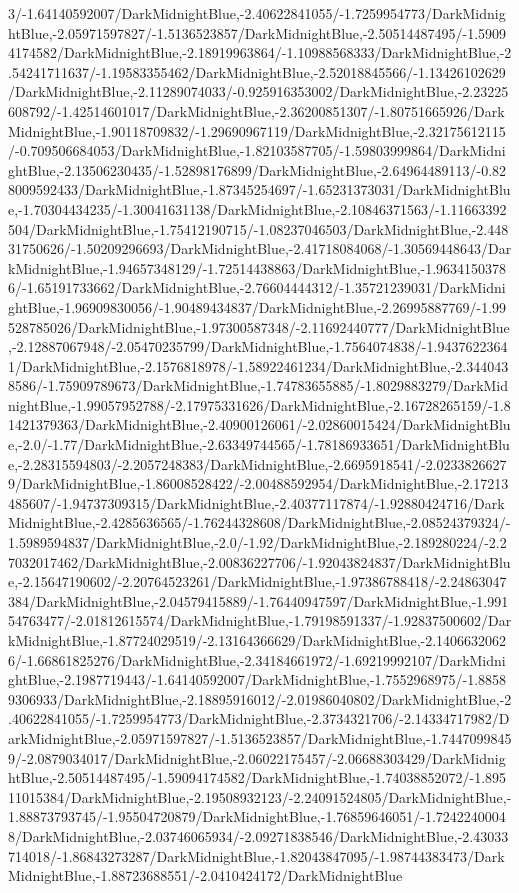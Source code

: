 {\begin{tikzternal}
3/-1.64140592007/DarkMidnightBlue,-2.40622841055/-1.7259954773/DarkMidnightBlue,-2.05971597827/-1.5136523857/DarkMidnightBlue,-2.50514487495/-1.59094174582/DarkMidnightBlue,-2.18919963864/-1.10988568333/DarkMidnightBlue,-2.54241711637/-1.19583355462/DarkMidnightBlue,-2.52018845566/-1.13426102629/DarkMidnightBlue,-2.11289074033/-0.925916353002/DarkMidnightBlue,-2.23225608792/-1.42514601017/DarkMidnightBlue,-2.36200851307/-1.80751665926/DarkMidnightBlue,-1.90118709832/-1.29690967119/DarkMidnightBlue,-2.32175612115/-0.709506684053/DarkMidnightBlue,-1.82103587705/-1.59803999864/DarkMidnightBlue,-2.13506230435/-1.52898176899/DarkMidnightBlue,-2.64964489113/-0.828009592433/DarkMidnightBlue,-1.87345254697/-1.65231373031/DarkMidnightBlue,-1.70304434235/-1.30041631138/DarkMidnightBlue,-2.10846371563/-1.11663392504/DarkMidnightBlue,-1.75412190715/-1.08237046503/DarkMidnightBlue,-2.44831750626/-1.50209296693/DarkMidnightBlue,-2.41718084068/-1.30569448643/DarkMidnightBlue,-1.94657348129/-1.72514438863/DarkMidnightBlue,-1.96341503786/-1.65191733662/DarkMidnightBlue,-2.76604444312/-1.35721239031/DarkMidnightBlue,-1.96909830056/-1.90489434837/DarkMidnightBlue,-2.26995887769/-1.99528785026/DarkMidnightBlue,-1.97300587348/-2.11692440777/DarkMidnightBlue,-2.12887067948/-2.05470235799/DarkMidnightBlue,-1.7564074838/-1.94376223641/DarkMidnightBlue,-2.1576818978/-1.58922461234/DarkMidnightBlue,-2.3440438586/-1.75909789673/DarkMidnightBlue,-1.74783655885/-1.8029883279/DarkMidnightBlue,-1.99057952788/-2.17975331626/DarkMidnightBlue,-2.16728265159/-1.81421379363/DarkMidnightBlue,-2.40900126061/-2.02860015424/DarkMidnightBlue,-2.0/-1.77/DarkMidnightBlue,-2.63349744565/-1.78186933651/DarkMidnightBlue,-2.28315594803/-2.2057248383/DarkMidnightBlue,-2.6695918541/-2.02338266279/DarkMidnightBlue,-1.86008528422/-2.00488592954/DarkMidnightBlue,-2.17213485607/-1.94737309315/DarkMidnightBlue,-2.40377117874/-1.92880424716/DarkMidnightBlue,-2.4285636565/-1.76244328608/DarkMidnightBlue,-2.08524379324/-1.5989594837/DarkMidnightBlue,-2.0/-1.92/DarkMidnightBlue,-2.189280224/-2.27032017462/DarkMidnightBlue,-2.00836227706/-1.92043824837/DarkMidnightBlue,-2.15647190602/-2.20764523261/DarkMidnightBlue,-1.97386788418/-2.24863047384/DarkMidnightBlue,-2.04579415889/-1.76440947597/DarkMidnightBlue,-1.99154763477/-2.01812615574/DarkMidnightBlue,-1.79198591337/-1.92837500602/DarkMidnightBlue,-1.87724029519/-2.13164366629/DarkMidnightBlue,-2.14066320626/-1.66861825276/DarkMidnightBlue,-2.34184661972/-1.69219992107/DarkMidnightBlue,-2.1987719443/-1.64140592007/DarkMidnightBlue,-1.7552968975/-1.88589306933/DarkMidnightBlue,-2.18895916012/-2.01986040802/DarkMidnightBlue,-2.40622841055/-1.7259954773/DarkMidnightBlue,-2.3734321706/-2.14334717982/DarkMidnightBlue,-2.05971597827/-1.5136523857/DarkMidnightBlue,-1.74470998459/-2.0879034017/DarkMidnightBlue,-2.06022175457/-2.06688303429/DarkMidnightBlue,-2.50514487495/-1.59094174582/DarkMidnightBlue,-1.74038852072/-1.89511015384/DarkMidnightBlue,-2.19508932123/-2.24091524805/DarkMidnightBlue,-1.88873793745/-1.95504720879/DarkMidnightBlue,-1.76859646051/-1.72422400048/DarkMidnightBlue,-2.03746065934/-2.09271838546/DarkMidnightBlue,-2.43033714018/-1.86843273287/DarkMidnightBlue,-1.82043847095/-1.98744383473/DarkMidnightBlue,-1.88723688551/-2.0410424172/DarkMidnightBlue
\end{tikzternal}}
